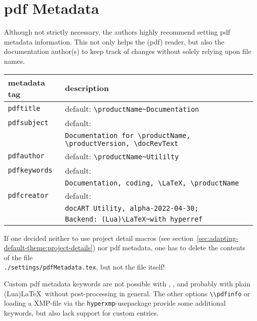 	\newpage
	\section{pdf Metadata}
		\label{sec:adapting-default-theme:pdf-metadata}
		Although not strictly necessary, the authors highly recommend setting pdf metadata information. This not only helps the (pdf) reader, but also the documentation author(s) to keep track of changes without solely relying upon file names.
		\begin{longtable}[c]{ll}
			\rowcolor{white}
			\textbf{metadata tag} & \textbf{description}\\
			\midrule
			\endfirsthead
			\rowcolor{tableRowHighlightColor}
			\lstinline$pdftitle$ & default: \lstinline$\productName~Documentation$\\
			\rowcolor{white}
			\lstinline$pdfsubject$ & default:\\
			\rowcolor{white}
			& \lstinline$Documentation for \productName, \productVersion, \docRevText$\\
			\rowcolor{tableRowHighlightColor}
			\lstinline$pdfauthor$ & \color{red} default: \lstinline$\productName~Utililty$\\
			\rowcolor{white}
			\lstinline$pdfkeywords$ & default: \\
			\rowcolor{white}
			& \lstinline$Documentation, coding, \LaTeX, \productName$\\
			\rowcolor{tableRowHighlightColor}
			\lstinline$pdfcreator$ & default:\\
			& \lstinline$docART Utility, alpha-2022-04-30;$\\
			\rowcolor{tableRowHighlightColor}
			& \lstinline$Backend: (Lua)\LaTeX~with hyperref$\\
			\midrule
		\end{longtable}
	
		\begin{daWarningBox}
			If one decided neither to use project detail macros (see \mbox{section \ref{sec:adapting-default-theme:project-details}}) nor pdf metadata, one has to delete the contents of the file\\ \lstinline$./settings/pdfMetadata.tex$, but not the file itself!
		\end{daWarningBox}
	
		\begin{daInfoBox}
			Custom pdf metadata keywords are not possible with \productName, \productVersion, and probably with plain \mbox{(Lua)\LaTeX}~without post-processing in general. The other options \lstinline$\\pdfinfo$ or loading a \mbox{XMP-file} via the \lstinline$hyperxmp$-usepackage provide some additional keywords, but also lack support for custom entries.
		\end{daInfoBox}
	
